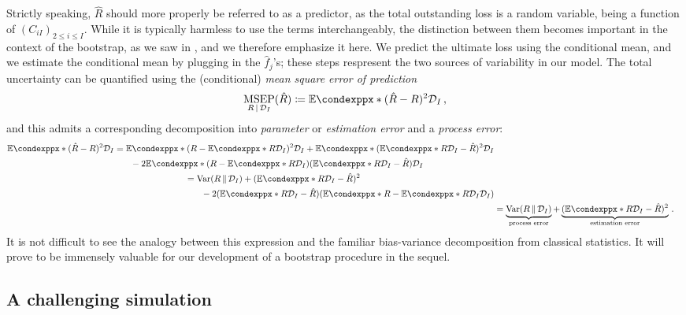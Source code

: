 \documentclass[a4paper]{book}
\theoremstyle{plain}
\newcommand{\condexpp}{\mathbb{E}\condexppx}
\begin{document}
Strictly speaking, $\hat{R}$ should more properly be referred to as a predictor, as the total outstanding loss is a random variable, being a function of $(C_{iI})_{2 \leq i \leq I}$. While it is typically harmless to use the terms interchangeably, the distinction between them becomes important in the context of the bootstrap, as we saw in , and we therefore emphasize it here. We predict the ultimate loss using the conditional mean, and we estimate the conditional mean by plugging in the $\hat{f}_j$'s; these steps respresent the two sources of variability in our model. The total uncertainty can be quantified using the (conditional) \emph{mean square error of prediction}
\begin{equation}
    \underset{R \, \vert \, \mathcal{D}_I}{\mathrm{MSEP}}(\hat{R}) \coloneqq \condexpp*{(\hat{R} - R)^2}{\mathcal{D}_I} \,,
\end{equation}
and this admits a corresponding decomposition into \emph{parameter} or \emph{estimation error} and a \emph{process error}:
\begin{align}
    \begin{split}
        \condexpp*{(\hat{R} - R)^2}{\mathcal{D}_I} &= \condexpp*{(R - \condexpp*{R}{\mathcal{D}_I})^2}{\mathcal{D}_I} + \condexpp*{(\condexpp*{R}{\mathcal{D}_I} - \hat{R})^2}{\mathcal{D}_I} \\ &\phantom{{}=1} -2\condexpp*{(R - \condexpp*{R}{\mathcal{D}_I})(\condexpp*{R}{\mathcal{D}_I} - \hat{R})}{\mathcal{D}_I}
    \end{split} \\
    \begin{split}
    &= \mathrm{Var}(R \, \Vert \, \mathcal{D}_I) + (\condexpp*{R}{\mathcal{D}_I} - \hat{R})^2 \\
    &\phantom{{}=1} -2(\condexpp*{R}{\mathcal{D}_I} - \hat{R})(\condexpp*{R - \condexpp*{R}{\mathcal{D}_I}}{\mathcal{D}_I})
    \end{split} \\
    &= \underbrace{\mathrm{Var}(R \, \Vert \, \mathcal{D}_I)}_\text{process error} + \underbrace{(\condexpp*{R}{\mathcal{D}_I} - \hat{R})^2}_\text{estimation error} \,.
\end{align}
It is not difficult to see the analogy between this expression and the familiar bias-variance decomposition from classical statistics. It will prove to be immensely valuable for our development of a bootstrap procedure in the sequel.

\subsection{A challenging simulation}
\end{document}

